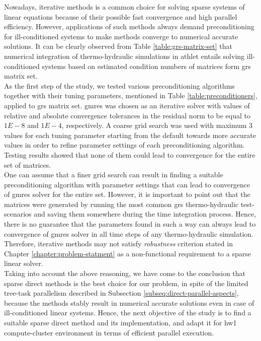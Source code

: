 \label{subseq:hybrid-method-description}

Nowadays, iterative methods is a common choice for solving sparse systems of linear equations because of their possible fast convergence and high parallel efficiency. However,  applications of such methods always demand preconditioning for ill-conditioned systems to make methods converge to numerical accurate solutions. It can be clearly observed from Table \ref{table:grs-matrix-set} that numerical integration of thermo-hydraulic simulations in \acrshort{athlet} entails solving ill-conditioned systems  based on estimated condition numbers of matrices form \acrshort{grs} matrix set.\\


As the first step of the study, we tested various preconditioning algorithms together with their tuning parameters, mentioned in Table \ref{table:preconditioners}, applied to \acrshort{grs} matrix set. \acrshort{gmres} was chosen as an iterative solver with values of relative and absolute convergence tolerances in the residual norm to be equal to $1E-8$ and $1E-4$, respectively. A coarse grid search was used with maximum 3 values for each tuning parameter starting from the default towards more accurate values in order to refine parameter settings of each preconditioning algorithm. Testing results showed that none of them could lead to convergence for the entire set of matrices.\\


One can assume that a finer grid search can result in finding a suitable preconditioning algorithm with parameter  settings that can lead to convergence of \acrshort{gmres} solver for the entire set. However, it is important to point out that the matrices were generated by running the most common \acrshort{grs} thermo-hydraulic test-scenarios and saving them somewhere during the time integration process. Hence, there is no guarantee that the parameters found in such a way can always lead to convergence of \acrshort{gmres} solver in all time steps of any thermo-hydraulic simulation. Therefore, iterative methods may not satisfy \textit{robustness} criterion  stated in Chapter \ref{chapter:problem-statment} as a non-functional requirement to a sparse linear solver.\\%


Taking into account the above reasoning, we have come to the conclusion that sparse direct methods is the best choice for our problem, in spite of the limited tree-task parallelism described in Subsection \ref{subseq:direct-parallel-aspects}, because the methods stably result in numerical accurate solutions even in case of ill-conditioned linear systems. Hence, the next objective of the study is to find a suitable sparse direct method and its implementation, and adapt it for \gls{hw1} compute-cluster environment in terms of efficient parallel execution. \\
